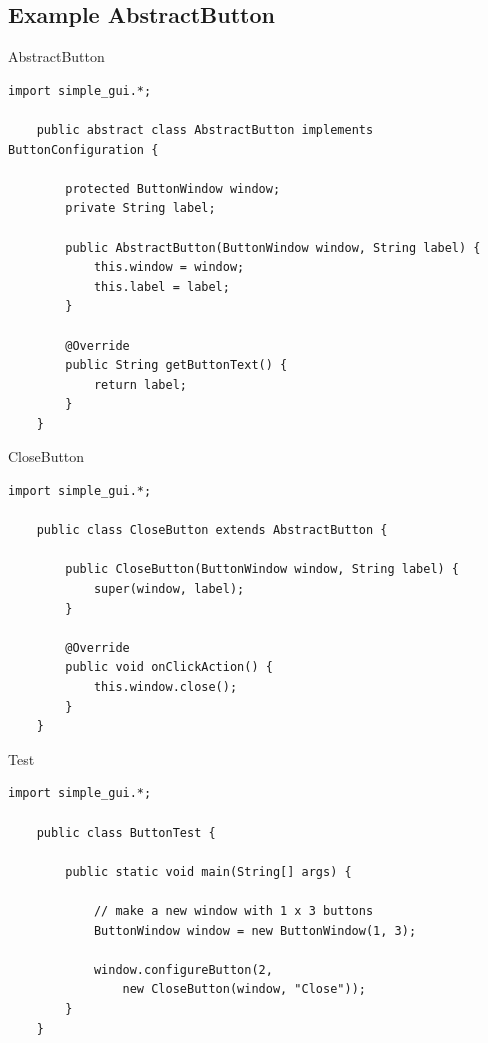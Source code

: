 \subsection{Example AbstractButton}
\begin{frame}[fragile]{AbstractButton}
	\begin{lstlisting}[basicstyle=\ttfamily\scriptsize, escapechar=!]
	import simple_gui.*;

	public abstract class AbstractButton implements ButtonConfiguration {
	
	    protected ButtonWindow window;
	    private String label;
	
	    public AbstractButton(ButtonWindow window, String label) {
	        this.window = window;
	        this.label = label;
	    }

	    @Override
	    public String getButtonText() {
	        return label;
	    }
	}	
	\end{lstlisting}
\end{frame}

\begin{frame}[fragile]{CloseButton}
	\begin{lstlisting}[basicstyle=\ttfamily\scriptsize, escapechar=!]
	import simple_gui.*;
	
	public class CloseButton extends AbstractButton {
	
	    public CloseButton(ButtonWindow window, String label) {
	        super(window, label);
	    }

	    @Override
	    public void onClickAction() {
	        this.window.close();
	    }
	}	
	\end{lstlisting}
\end{frame}

\begin{frame}[fragile]{Test}
	\begin{lstlisting}[basicstyle=\ttfamily\scriptsize]
	import simple_gui.*;

	public class ButtonTest {

	    public static void main(String[] args) {
		
	        // make a new window with 1 x 3 buttons
	        ButtonWindow window = new ButtonWindow(1, 3);
	        
	        window.configureButton(2, 
	            new CloseButton(window, "Close"));
	    }
	}	
	\end{lstlisting}
\end{frame}

%


